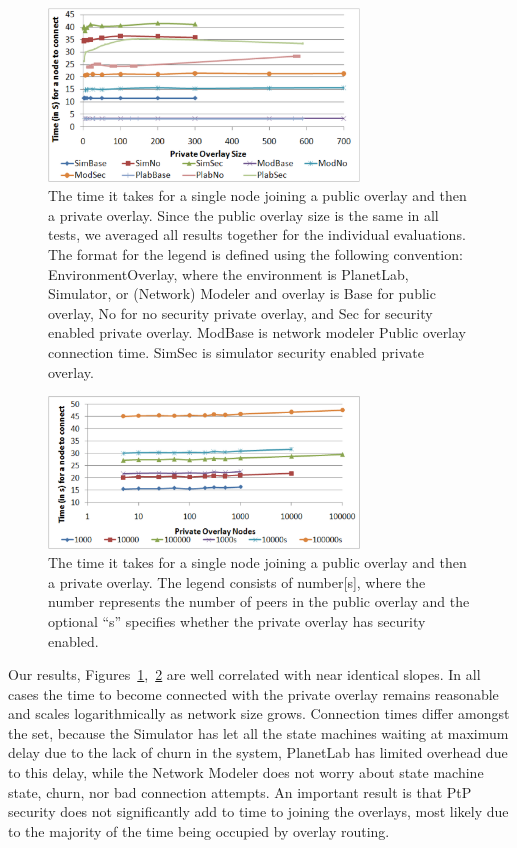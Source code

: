 \documentclass[conference]{IEEEtran}
\begin{document}
\begin{figure}[h]
\centering
\includegraphics[width=3.25in]{single_join.eps}
\caption{The time it takes for a single node joining a public overlay and then
a private overlay. Since the public overlay size is the same in all tests, we
averaged all results together for the individual evaluations.  The format for
the legend is defined using the following convention: EnvironmentOverlay,
where the environment is PlanetLab, Simulator, or (Network) Modeler and
overlay is Base for public overlay, No for no security private overlay, and
Sec for security enabled private overlay.  ModBase is network modeler
Public overlay connection time.  SimSec is simulator security enabled private
overlay.}
\label{fig:single_join}
\end{figure}


\begin{figure}[h]
\centering
\includegraphics[width=3.25in]{single_join_mod.eps}
\caption{The time it takes for a single node joining a public overlay and then
a private overlay. The legend consists of number[s], where the number
represents the number of peers in the public overlay and the optional ``s''
specifies whether the private overlay has security enabled.}
\label{fig:single_join_mod}
\end{figure}

Our results, Figures~\ref{fig:single_join},~\ref{fig:single_join_mod} are well
correlated with near identical slopes.  In all cases the time to become
connected with the private overlay remains reasonable and scales logarithmically
as network size grows.  Connection times differ amongst the set, because
the Simulator has let all the state machines waiting at maximum delay due to
the lack of churn in the system, PlanetLab has limited overhead due to this
delay, while the Network Modeler does not worry about state machine state,
churn, nor bad connection attempts.  An important result is that PtP security
does not significantly add to time to joining the overlays, most likely due
to the majority of the time being occupied by overlay routing.
\end{document}
